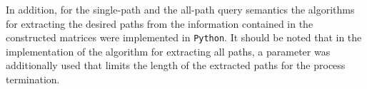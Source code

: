 In addition, for the single-path and the all-path query semantics the algorithms for extracting the desired paths from the information contained in the constructed matrices were implemented in \texttt{Python}. It should be noted that in the implementation of the algorithm for extracting all paths, a parameter was additionally used that limits the length of the extracted paths for the process termination.

\clearpage
